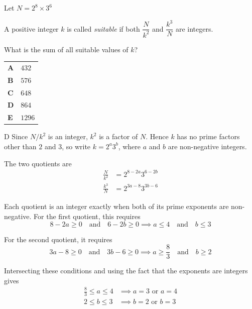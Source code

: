 \documentclass[11pt,a4paper]{article}
\begin{document}
\clearpage
\thispagestyle{djssolutions}
\vspace*{8pt}
\begin{enumerate}[label=\textbf{\arabic*.},leftmargin=*,itemsep=0pt,start=11]
\questionitem[Number]
Let $N=2^8\times3^6$ 

A positive integer $k$ is called \textit{suitable} if both $\dfrac{N}{k^2}$ and $\dfrac{k^3}{N}$ are integers. 

What is the sum of all suitable values of $k$?

\par\vspace*{12pt}
\begin{tabularx}{\linewidth}{@{}>{\bfseries}l Y@{}}
A &
$432$
\\[0.8em]
B &
$576$
\\[0.8em]
C &
$648$
\\[0.8em]
D &
$864$
\\[0.8em]
E &
$1296$
\\
\end{tabularx}

\begin{djsSolution}{D}
Since $N/k^2$ is an integer, $k^2$ is a factor of $N$. Hence $k$ has no prime factors other than $2$ and $3$, so write $k=2^a3^b$, where $a$ and $b$ are non-negative integers.

The two quotients are
\[
\begin{aligned}
\frac{N}{k^2}&=2^{8-2a}3^{6-2b}\\[8pt]
\frac{k^3}{N}&=2^{3a-8}3^{3b-6}
\end{aligned}
\]

Each quotient is an integer exactly when both of its prime exponents are non-negative. For the first quotient, this requires
\[
8-2a\geq0\quad\text{and}\quad6-2b\geq0
\implies a\leq4\quad\text{and}\quad b\leq3
\]

For the second quotient, it requires
\[
3a-8\geq0\quad\text{and}\quad3b-6\geq0
\implies a\geq\frac83\quad\text{and}\quad b\geq2
\]

Intersecting these conditions and using the fact that the exponents are integers gives
\[
\begin{aligned}
\frac83\leq a\leq4&\implies a=3\text{ or }a=4\\[8pt]
2\leq b\leq3&\implies b=2\text{ or }b=3
\end{aligned}
\]


\end{djsSolution}
\end{enumerate}
\end{document}
